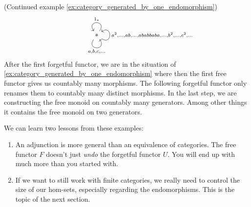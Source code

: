 \begin{example}{(Continued example \ref{ex:category_generated_by_one_endomorphism})}
\[\begin{minipage}{.25\textwidth}
\begin{tikzcd}
\ast \arrow["{a, b, c,\dots}"', loop, distance=2em, in=305, out=235] \arrow["1_{\ast}"', loop, distance=2em, in=125, out=55] \arrow["{a^{2},\dots,ab,\dots,ababbaba,\dots,b^{2},\dots,c^{2},\dots}"', loop, distance=2em, in=35, out=325]
\end{tikzcd}
\end{minipage}
\begin{minipage}{.10\textwidth}
\phantom{}
\end{minipage}
\]
After the first forgetful functor, we are in the situation of \ref{ex:category_generated_by_one_endomorphism} where then the first free functor
gives us countably many morphisms.
The following forgetful functor only renames them to countably many distinct morphisms.
In the last step, we are constructing the free monoid on countably many generators. Among other things it contains the free monoid on two
generators.
\end{example}

We can learn two lessons from these examples:
\begin{enumerate}
\item An adjunction is more general than an equivalence of categories. The free functor $F$ doesn't just \textit{undo} the forgetful functor $U$.
You will end up with much more than you started with.
\item If we want to still work with finite categories, we really need to control the size of our hom-sets, especially regarding the endomorphisms.
This is the topic of the next section.
\end{enumerate}

\vspace{4em}

